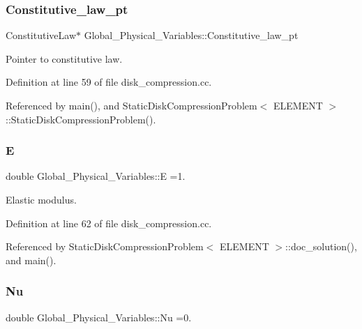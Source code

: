 \subsubsection{\texorpdfstring{Constitutive\+\_\+law\+\_\+pt}{Constitutive\_law\_pt}}
{\footnotesize\ttfamily Constitutive\+Law$\ast$ Global\+\_\+\+Physical\+\_\+\+Variables\+::\+Constitutive\+\_\+law\+\_\+pt}



Pointer to constitutive law. 



Definition at line 59 of file disk\+\_\+compression.\+cc.



Referenced by main(), and Static\+Disk\+Compression\+Problem$<$ E\+L\+E\+M\+E\+N\+T $>$\+::\+Static\+Disk\+Compression\+Problem().

\mbox{\label{namespaceGlobal__Physical__Variables_a09a019474b7405b35da2437f7779bc7e}} 
\subsubsection{\texorpdfstring{E}{E}}
{\footnotesize\ttfamily double Global\+\_\+\+Physical\+\_\+\+Variables\+::E =1.}



Elastic modulus. 



Definition at line 62 of file disk\+\_\+compression.\+cc.



Referenced by Static\+Disk\+Compression\+Problem$<$ E\+L\+E\+M\+E\+N\+T $>$\+::doc\+\_\+solution(), and main().

\mbox{\label{namespaceGlobal__Physical__Variables_a3962c36313826b19f216f6bbbdd6a477}} 
\subsubsection{\texorpdfstring{Nu}{Nu}}
{\footnotesize\ttfamily double Global\+\_\+\+Physical\+\_\+\+Variables\+::\+Nu =0.}



